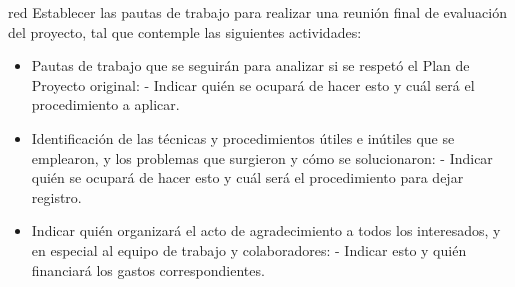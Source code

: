 \documentclass[
11pt, %
]{charter}
\begin{document}
\begin{consigna}{red}
Establecer las pautas de trabajo para realizar una reunión final de evaluación del proyecto, tal que contemple las siguientes actividades:

\begin{itemize}
	\item Pautas de trabajo que se seguirán para analizar si se respetó el Plan de Proyecto original:
	 - Indicar quién se ocupará de hacer esto y cuál será el procedimiento a aplicar. 
	\item Identificación de las técnicas y procedimientos útiles e inútiles que se emplearon, y los problemas que surgieron y cómo se solucionaron:
	 - Indicar quién se ocupará de hacer esto y cuál será el procedimiento para dejar registro.
	\item Indicar quién organizará el acto de agradecimiento a todos los interesados, y en especial al equipo de trabajo y colaboradores:
	  - Indicar esto y quién financiará los gastos correspondientes.
\end{itemize}

\end{consigna}
\end{document}
